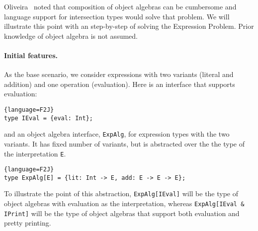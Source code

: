 


Oliveira~\cite{} noted that composition of object algebras can be cumbersome and
language support for intersection types would solve that problem. 
We will illustrate this point with an step-by-step of solving the Expression
Problem. Prior knowledge of object algebra is not assumed.

\paragraph{Initial features.}
As the base scenario, we consider expressions with two variants (literal and
addition) and one operation (evaluation). Here is an interface that supports
evaluation:
\begin{lstlisting}{language=F2J}
type IEval = {eval: Int};
\end{lstlisting}
and an object algebra interface, \lstinline$ExpAlg$, for expression types with
the two variants. It has fixed number of variants, but is abstracted over the
the type of the interpretation \lstinline$E$.
\begin{lstlisting}{language=F2J}
type ExpAlg[E] = {lit: Int -> E, add: E -> E -> E};
\end{lstlisting}
To illustrate the point of this abstraction, \lstinline$ExpAlg[IEval]$ will be
the type of object algebras with evaluation as the interpretation, whereas
\lstinline$ExpAlg[IEval & IPrint]$ will be the type of object algebras that
support both evaluation and pretty printing.


